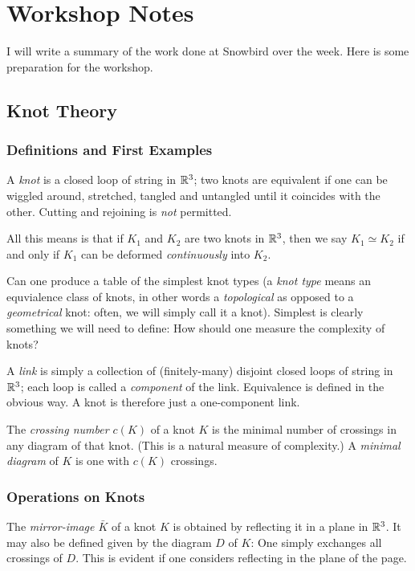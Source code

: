 \chapter{Workshop Notes}
I will write a summary of the work done at Snowbird over the week. Here is
some preparation for the workshop.
\section{Knot Theory}
\subsection{Definitions and First Examples}
\begin{definition}[Provisional]
  A \emph{knot} is a closed loop of string in $\mathbb{R}^3$; two knots are
  equivalent if one can be wiggled around, stretched, tangled and untangled
  until it coincides with the other. Cutting and rejoining is \emph{not}
  permitted.
\end{definition}

All this means is that if $K_1$ and $K_2$ are two knots in $\mathbb{R}^3$, then
we say $K_1\simeq K_2$ if and only if $K_1$ can be deformed
\emph{continuously} into $K_2$.

\begin{remark}
  Can one produce a table of the simplest knot types (a \emph{knot type}
  means an equvialence class of knots, in other words a \emph{topological}
  as opposed to a \emph{geometrical} knot: often, we will simply call it a
  knot). Simplest is clearly something we will need to define: How should
  one measure the complexity of knots?
\end{remark}

\begin{definition}
  A \emph{link} is simply a collection of (finitely-many) disjoint closed
  loops of string in $\mathbb{R}^3$; each loop is called a \emph{component} of
  the link. Equivalence is defined in the obvious way. A knot is therefore
  just a one-component link.
\end{definition}

\begin{definition}
  The \emph{crossing number $c(K)$} of a knot $K$ is the minimal number of
  crossings in any diagram of that knot. (This is a natural measure of
  complexity.) A \emph{minimal diagram} of $K$ is one with $c(K)$
  crossings.
\end{definition}
\subsection{Operations on Knots}
\begin{definition}
  The \emph{mirror-image $\bar K$} of a knot $K$ is obtained by reflecting
  it in a plane in $\mathbb{R}^3$. It may also be defined given by the diagram
  $D$ of $K$: One simply exchanges all crossings of $D$. This is evident if
  one considers reflecting in the plane of the page.
\end{definition}


